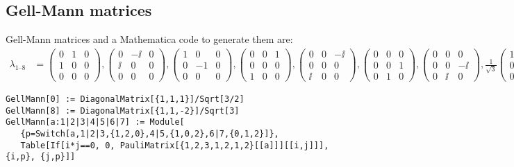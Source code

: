 \documentclass[CheatSheet]{subfiles}
\begin{document}
\subsection{Gell-Mann matrices}
Gell-Mann matrices and a Mathematica code to generate them are:
\begin{align}
 \lambda_{1\text{--}8} &=
  \left(\begin{smallmatrix} 0&1&0 \\ 1&0&0 \\ 0&0&0 \end{smallmatrix}\right),
  \left(\begin{smallmatrix} 0&-\ii&0 \\ \ii&0&0 \\ 0&0&0  \end{smallmatrix}\right),
  \left(\begin{smallmatrix} 1&0&0 \\ 0&-1&0 \\ 0&0&0  \end{smallmatrix}\right),
  \left(\begin{smallmatrix} 0&0&1 \\ 0&0&0 \\ 1&0&0  \end{smallmatrix}\right),
  \left(\begin{smallmatrix} 0&0&-\ii \\ 0&0&0 \\ \ii&0&0  \end{smallmatrix}\right),
  \left(\begin{smallmatrix} 0&0&0 \\ 0&0&1 \\ 0&1&0  \end{smallmatrix}\right),
  \left(\begin{smallmatrix} 0&0&0 \\ 0&0&-\ii \\ 0&\ii&0  \end{smallmatrix}\right),
  \tfrac1{\sqrt3}\left(\begin{smallmatrix} 1&0&0 \\ 0&1&0 \\ 0&0&-2 \end{smallmatrix}\right).
\end{align}
\begin{verbatim}
GellMann[0] := DiagonalMatrix[{1,1,1}]/Sqrt[3/2]
GellMann[8] := DiagonalMatrix[{1,1,-2}]/Sqrt[3]
GellMann[a:1|2|3|4|5|6|7] := Module[
   {p=Switch[a,1|2|3,{1,2,0},4|5,{1,0,2},6|7,{0,1,2}]},
   Table[If[i*j==0, 0, PauliMatrix[{1,2,3,1,2,1,2}[[a]]][[i,j]]], {i,p}, {j,p}]]
\end{verbatim}
\end{document}

